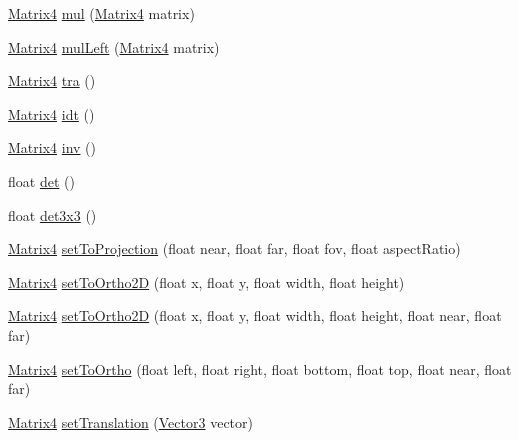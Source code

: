 \begin{DoxyCompactItemize}
\hyperlink{classairhockeyjava_1_1util_1_1_matrix4}{Matrix4} \hyperlink{classairhockeyjava_1_1util_1_1_matrix4_aa6ed37f87c2df2a05b8af4da00f468b4}{mul} (\hyperlink{classairhockeyjava_1_1util_1_1_matrix4}{Matrix4} matrix)
\item 
\hyperlink{classairhockeyjava_1_1util_1_1_matrix4}{Matrix4} \hyperlink{classairhockeyjava_1_1util_1_1_matrix4_a0312b7b79f95865eb7d1fa62f0596ed3}{mul\+Left} (\hyperlink{classairhockeyjava_1_1util_1_1_matrix4}{Matrix4} matrix)
\item 
\hyperlink{classairhockeyjava_1_1util_1_1_matrix4}{Matrix4} \hyperlink{classairhockeyjava_1_1util_1_1_matrix4_a2ae7326b3be5d1ce4a38c42125a383ae}{tra} ()
\item 
\hyperlink{classairhockeyjava_1_1util_1_1_matrix4}{Matrix4} \hyperlink{classairhockeyjava_1_1util_1_1_matrix4_aace93255b8cbb5b281062489f840311a}{idt} ()
\item 
\hyperlink{classairhockeyjava_1_1util_1_1_matrix4}{Matrix4} \hyperlink{classairhockeyjava_1_1util_1_1_matrix4_abe1d344de0df0b9a0c876ee2d1488039}{inv} ()
\item 
float \hyperlink{classairhockeyjava_1_1util_1_1_matrix4_ae50f31851136c21b1c02d6181d96681b}{det} ()
\item 
float \hyperlink{classairhockeyjava_1_1util_1_1_matrix4_adf6425cf194d67c94043dcd315aaeb5a}{det3x3} ()
\item 
\hyperlink{classairhockeyjava_1_1util_1_1_matrix4}{Matrix4} \hyperlink{classairhockeyjava_1_1util_1_1_matrix4_a3bf779fc3b872efb0370d65e7f271b66}{set\+To\+Projection} (float near, float far, float fov, float aspect\+Ratio)
\item 
\hyperlink{classairhockeyjava_1_1util_1_1_matrix4}{Matrix4} \hyperlink{classairhockeyjava_1_1util_1_1_matrix4_a2eac1591b975d289f41d16996ef9b099}{set\+To\+Ortho2\+D} (float x, float y, float width, float height)
\item 
\hyperlink{classairhockeyjava_1_1util_1_1_matrix4}{Matrix4} \hyperlink{classairhockeyjava_1_1util_1_1_matrix4_a3cb44f4548e6135d676ad491a7c78608}{set\+To\+Ortho2\+D} (float x, float y, float width, float height, float near, float far)
\item 
\hyperlink{classairhockeyjava_1_1util_1_1_matrix4}{Matrix4} \hyperlink{classairhockeyjava_1_1util_1_1_matrix4_afcfdb10787df6437b09cc69e8e05b166}{set\+To\+Ortho} (float left, float right, float bottom, float top, float near, float far)
\item 
\hyperlink{classairhockeyjava_1_1util_1_1_matrix4}{Matrix4} \hyperlink{classairhockeyjava_1_1util_1_1_matrix4_ab2fc6a8490c2a07c297a8eb492758161}{set\+Translation} (\hyperlink{classairhockeyjava_1_1util_1_1_vector3}{Vector3} vector)

\end{DoxyCompactItemize}

